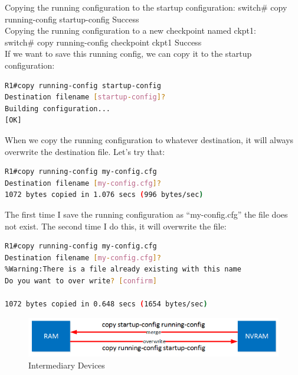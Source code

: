 \documentclass[a4paper,11pt]{article}
\begin{document}
\begin{tcolorbox}[colframe=blue!80, colback=blue!20, coltitle=black, title= Scenario: Copying the running configuration to the startup configuration]
Copying the running configuration to the startup configuration:
switch\# copy running-config startup-config
Success\\

Copying the running configuration to a new checkpoint named ckpt1:\\

switch\# copy running-config checkpoint ckpt1
Success\\

If we want to save this running config, we can copy it to the startup configuration:\\
\begin{lstlisting}[language=bash, caption={Configuration on a Cisco Device}]
R1#copy running-config startup-config
Destination filename [startup-config]? 
Building configuration...
[OK]
\end{lstlisting}

When we copy the running configuration to whatever destination, it will always overwrite the destination file. Let’s try that:\\
\begin{lstlisting}[language=bash, caption={Configuration on a Cisco}] R1#copy running-config my-config.cfg
Destination filename [my-config.cfg]? 
1072 bytes copied in 1.076 secs (996 bytes/sec)
\end{lstlisting}

The first time I save the running configuration as “my-config.cfg” the file does not exist. The second time I do this, it will overwrite the file:\\
\begin{lstlisting}[language=bash, caption={Configuration on a Cisco}]
R1#copy running-config my-config.cfg
Destination filename [my-config.cfg]? 
%Warning:There is a file already existing with this name 
Do you want to over write? [confirm]

1072 bytes copied in 0.648 secs (1654 bytes/sec)
\end{lstlisting}
\end{tcolorbox}

\begin{figure}[h!]
    \centering
    \includegraphics[width=\textwidth]{3.png}
    \caption{Intermediary Devices}
    \label{fig:cap1}
\end{figure}
 
\end{document}
